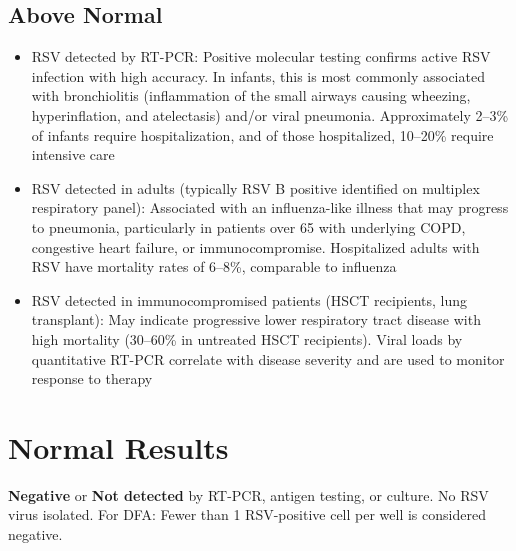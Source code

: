 \subsection*{Above Normal}
\begin{itemize}
  \item RSV detected by RT-PCR: Positive molecular testing confirms active RSV infection with high accuracy. In infants, this is most commonly associated with bronchiolitis (inflammation of the small airways causing wheezing, hyperinflation, and atelectasis) and/or viral pneumonia. Approximately 2--3\% of infants require hospitalization, and of those hospitalized, 10--20\% require intensive care
  \item RSV detected in adults (typically RSV B positive identified on multiplex respiratory panel): Associated with an influenza-like illness that may progress to pneumonia, particularly in patients over 65 with underlying COPD, congestive heart failure, or immunocompromise. Hospitalized adults with RSV have mortality rates of 6--8\%, comparable to influenza \cite{lee2013high}
  \item RSV detected in immunocompromised patients (HSCT recipients, lung transplant): May indicate progressive lower respiratory tract disease with high mortality (30--60\% in untreated HSCT recipients). Viral loads by quantitative RT-PCR correlate with disease severity and are used to monitor response to therapy
\end{itemize}

\section*{Normal Results}
\textbf{Negative} or \textbf{Not detected} by RT-PCR, antigen testing, or culture. No RSV virus isolated. For DFA: Fewer than 1 RSV-positive cell per well is considered negative.

